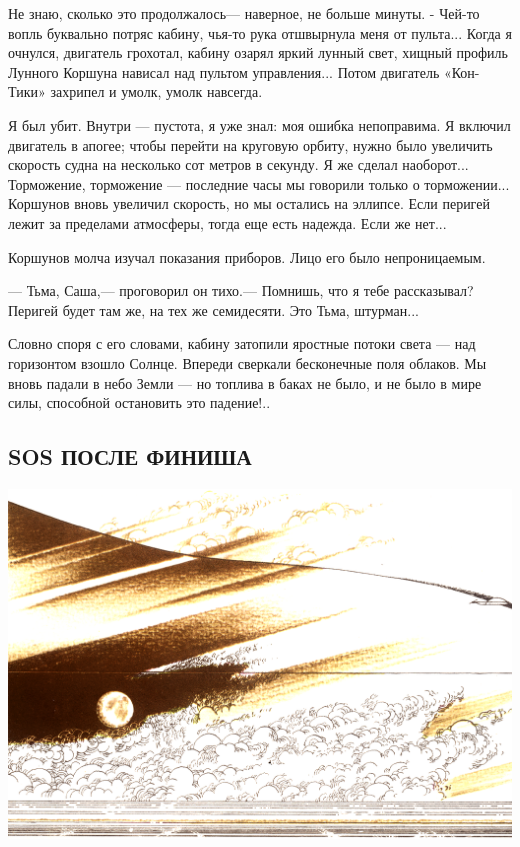 \documentclass[11pt,a4paper,oneside]{article}
\begin{document}
Не знаю, сколько это продолжалось— наверное, не больше минуты. - Чей-то вопль буквально потряс кабину, чья-то рука отшвырнула меня от пульта... Когда я очнулся, двигатель грохотал, кабину озарял яркий лунный свет, хищный профиль Лунного Коршуна нависал над пультом управления... Потом двигатель «Кон-Тики» захрипел и умолк, умолк навсегда.

Я был убит. Внутри — пустота, я уже знал: моя ошибка непоправима. Я включил двигатель в апогее; чтобы перейти на круговую орбиту, нужно было увеличить скорость судна на несколько сот метров в секунду. Я же сделал наоборот... Торможение, торможение — последние часы мы говорили только о торможении... Коршунов вновь увеличил скорость, но мы остались на эллипсе. Если перигей лежит за пределами атмосферы, тогда еще есть надежда. Если же нет...

Коршунов молча изучал показания приборов. Лицо его было непроницаемым.

— Тьма, Саша,— проговорил он тихо.— Помнишь, что я тебе рассказывал? Перигей будет там же, на тех же семидесяти. Это Тьма, штурман...

Словно споря с его словами, кабину затопили яростные потоки света — над горизонтом взошло Солнце. Впереди сверкали бесконечные поля облаков. Мы вновь падали в небо Земли — но топлива в баках не было, и не было в мире силы, способной остановить это падение!..

\subsection{SOS ПОСЛЕ ФИНИША}
\label{sos}

\includegraphics[width=\textwidth]{sos1}
\end{document}
